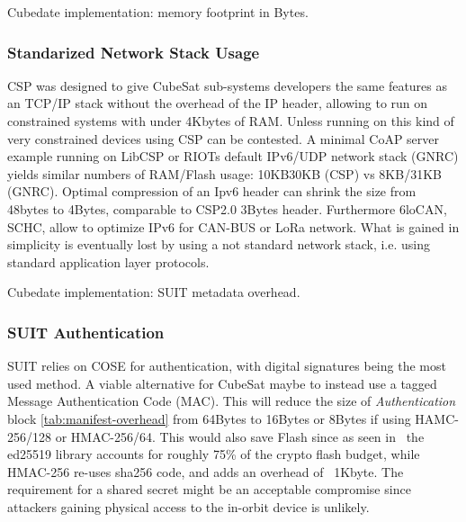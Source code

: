\begin{table}[ht]
\begin{adjustbox}{width=0.8\columnwidth,center}
    \centering
    
\end{adjustbox}
\caption{Cubedate implementation: memory footprint in Bytes.}
\label{tab:footprint}
\end{table}

\subsubsection{Standarized Network Stack Usage}

CSP was designed to give CubeSat sub-systems developers the same features as an
TCP/IP stack without the overhead of the IP header, allowing to run on constrained
systems with under 4Kbytes of RAM. Unless running on this kind of very constrained
devices using CSP can be contested. A minimal CoAP server example running on
LibCSP or RIOTs default IPv6/UDP network stack (GNRC) yields similar numbers of RAM/Flash
usage: 10KB\/30KB (CSP) vs 8KB/31KB (GNRC). Optimal compression of an Ipv6 header
can shrink the size from 48bytes to 4Bytes, comparable to CSP2.0 3Bytes header.
Furthermore  6loCAN\cite{wachter20206locan01}, SCHC\cite{rfc8724}, allow to
optimize IPv6 for CAN-BUS or LoRa network. What is gained in simplicity is eventually
lost by using a not standard network stack, i.e. using standard application
layer protocols.

\begin{table}[ht]

\begin{adjustbox}{width=0.5\columnwidth,center}
    \centering
    
\end{adjustbox}
\caption{Cubedate implementation: SUIT metadata overhead.}
\label{tab:manifest-overhead}
\end{table}

\subsubsection{SUIT Authentication}

SUIT relies on COSE for authentication, with digital signatures being the most
used method. A viable alternative for CubeSat maybe to instead use a tagged Message
Authentication Code (MAC). This will reduce the size of \textit{Authentication} block
\ref*{tab:manifest-overhead} from 64Bytes to 16Bytes or 8Bytes if using HAMC-256/128
or HMAC-256/64. This would also save Flash since as seen in~\cite{zandberg2019secure}
the ed25519 library accounts for roughly 75\% of the crypto flash budget, while HMAC-256
re-uses sha256 code, and adds an overhead of ~1Kbyte. The requirement for a shared secret
might be an acceptable compromise since attackers gaining physical access to the
in-orbit device is unlikely.

